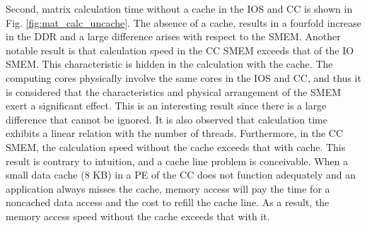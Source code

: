   Second, matrix calculation time without a cache in the IOS and CC is shown in Fig. \ref{fig:mat_calc_uncache}.
  The absence of a cache, results in a fourfold increase in the DDR and a large difference arises with respect to the SMEM.
  Another notable result is that calculation speed in the CC SMEM exceeds that of the IO SMEM.
  This characteristic is hidden in the calculation with the cache.
  The computing cores physically involve the same cores in the IOS and CC, and thus it is considered that the characteristics and physical arrangement of the SMEM exert a significant effect.
  This is an interesting result since there is a large difference that cannot be ignored.
  It is also observed that calculation time exhibits a linear relation with the number of threads.
  Furthermore, in the CC SMEM, the calculation speed without the cache exceeds that with cache.
  This result is contrary to intuition, and a cache line problem is conceivable.
  When a small data cache (8 KB) in a PE of the CC does not function adequately and an application always misses the cache, memory access will pay the time for a noncached data access and the cost to refill the cache line.
  As a result, the memory access speed without the cache exceeds that with it.
  
